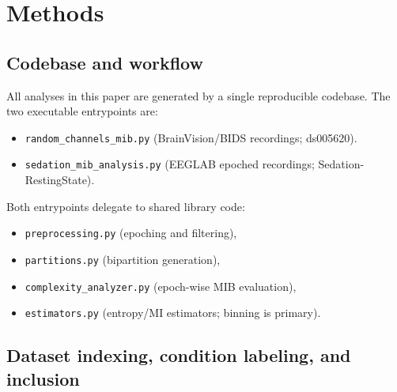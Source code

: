 \documentclass[11pt]{article}
\begin{document}
\section{Methods}
\subsection{Codebase and workflow}
All analyses in this paper are generated by a single reproducible codebase. The two executable entrypoints are:
\begin{itemize}[leftmargin=*]
    \item \texttt{random\_channels\_mib.py} (BrainVision/BIDS recordings; ds005620).
    \item \texttt{sedation\_mib\_analysis.py} (EEGLAB epoched recordings; Sedation-RestingState).
\end{itemize}
Both entrypoints delegate to shared library code:
\begin{itemize}[leftmargin=*]
    \item \texttt{preprocessing.py} (epoching and filtering),
    \item \texttt{partitions.py} (bipartition generation),
    \item \texttt{complexity\_analyzer.py} (epoch-wise MIB evaluation),
    \item \texttt{estimators.py} (entropy/MI estimators; binning is primary).
\end{itemize}

\subsection{Dataset indexing, condition labeling, and inclusion}
\end{document}
